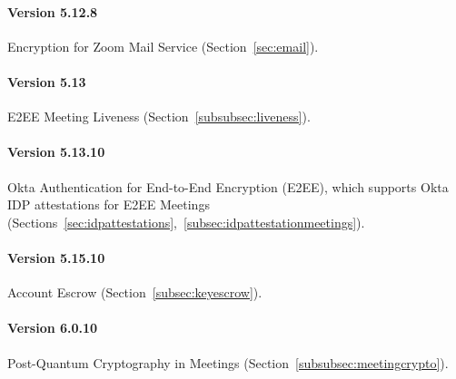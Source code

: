 \paragraph{Version 5.12.8}
Encryption for Zoom Mail Service (Section~\ref{sec:email}).

\paragraph{Version 5.13}
E2EE Meeting Liveness (Section~\ref{subsubsec:liveness}).

\paragraph{Version 5.13.10}
Okta Authentication for End-to-End Encryption (E2EE), which supports Okta IDP attestations for E2EE
Meetings (Sections~\ref{sec:idpattestations},~\ref{subsec:idpattestationmeetings}).

\paragraph{Version 5.15.10}
Account Escrow (Section~\ref{subsec:keyescrow}).

\paragraph{Version 6.0.10}
Post-Quantum Cryptography in Meetings (Section~\ref{subsubsec:meetingcrypto}).
